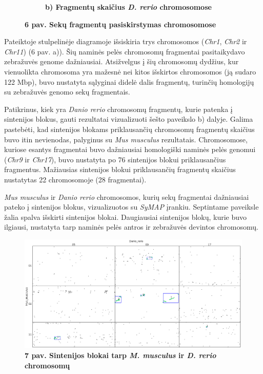 \documentclass[12pt]{article}
\begin{document}
\begin{figure}[htb]
\begin{subfigure}[b]{0.45\textwidth}
        \caption*{\centering\small\textbf{b) Fragmentų skaičius \emph{D. rerio}
                                          chromosomose}}
    \end{subfigure}
    \caption*{\small\textbf{6 pav. Sekų fragmentų pasiskirstymas chromosomose}}
    \label{fig:6}
\end{figure}

Pateiktoje stulpelinėje diagramoje išsiskiria trys chromosomos (\emph{Chr1},
\emph{Chr2} ir \emph{Chr11}) (6 pav. a)). Šių naminės pelės chromosomų
fragmentai pasitaikydavo zebražuvės genome dažniausiai. Atsižvelgus į šių
chromosomų dydžius, kur vienuolikta chromosoma yra mažesnė nei kitos išskirtos
chromosomos (ją sudaro 122 Mbp\cite{MGI}), buvo nustatyta sąlyginai didelė dalis
fragmentų, turinčių homologijų su zebražuvės genomo sekų fragmentais.

Patikrinus, kiek yra \emph{Danio rerio} chromosomų fragmentų, kurie patenka į
sintenijos blokus, gauti rezultatai vizualizuoti šešto paveikslo b) dalyje.
Galima pastebėti, kad sintenijos blokams priklausančių chromosomų fragmentų
skaičius buvo itin nevienodas, palyginus su \emph{Mus musculus} rezultatais.
Chromosomose, kuriose esantys fragmentai buvo dažniausiai homologiški naminės
pelės genomui (\emph{Chr9} ir \emph{Chr17}), buvo nustatyta po 76 sintenijos
blokui priklausančius fragmentus. Mažiausias sintenijos blokui priklausančių
fragmentų skaičius nustatytas 22 chromosomoje (28 fragmentai).

\emph{Mus musculus} ir \emph{Danio rerio} chromosomos, kurių sekų fragmentai
dažniausiai pateko į sintenijos blokus, vizualizuotos su \emph{SyMAP} įrankiu.
Septintame paveiksle žalia spalva išskirti sintenijos blokai. Daugiausiai
sintenijos blokų, kurie buvo ilgiausi, nustatyta tarp naminės pelės antros
ir zebražuvės devintos chromosomų.

\newpage

\begin{figure}[htb]
    \begin{center}
        \includegraphics[width=0.8\linewidth]{../Figures/Blocks_Chr2_9.png}
        \vspace{-1\baselineskip}
        \caption*{\small\textbf{7 pav. Sintenijos blokai tarp \emph{M. musculus}
                                ir \emph{D. rerio} chromosomų}}
        \label{fig:7}
    \end{center}
\end{figure}
\end{document}
